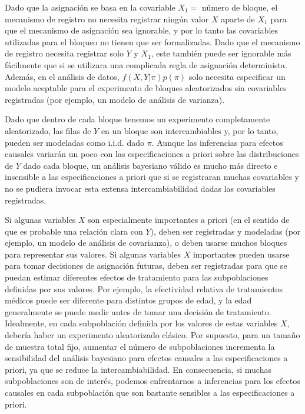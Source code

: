 \documentclass[12pt,a4paper]{article}
\begin{document}
{Dado que la asignación se basa en la covariable $X_1 =$ número de bloque, el mecanismo de registro no necesita registrar ningún valor $X$ aparte de $X_1$ para que el mecanismo de asignación sea ignorable, y por lo tanto las covariables utilizadas para el bloqueo no tienen que ser formalizadas. Dado que el mecanismo de registro necesita registrar solo $Y$ y $X_1$, este también puede ser ignorable más fácilmente que si se utilizara una complicada regla de asignación determinista. Además, en el análisis de datos, $f(X,Y|\pi)p(\pi)$ solo necesita especificar un modelo aceptable para el experimento de bloques aleatorizados sin covariables registradas (por ejemplo, un modelo de análisis de varianza). 

Dado que dentro de cada bloque tenemos un experimento completamente aleatorizado, las filas de $Y$ en un bloque son intercambiables y, por lo tanto, pueden ser modeladas como i.i.d. dado $\pi$. Aunque las inferencias para efectos causales variarán un poco con las especificaciones a priori sobre las distribuciones de $Y$ dado cada bloque, un análisis bayesiano válido es mucho más directo e insensible a las especificaciones a priori que si se registraran muchas covariables y no se pudiera invocar esta extensa intercambiabilidad dadas las covariables registradas. 

Si algunas variables $X$ son especialmente importantes a priori (en el sentido de que es probable una relación clara con $Y$), deben ser registradas y modeladas (por ejemplo, un modelo de análisis de covarianza), o deben usarse muchos bloques para representar sus valores. Si algunas variables $X$ importantes pueden usarse para tomar decisiones de asignación futuras, deben ser registradas para que se puedan estimar diferentes efectos de tratamiento para las subpoblaciones definidas por sus valores. Por ejemplo, la efectividad relativa de tratamientos médicos puede ser diferente para distintos grupos de edad, y la edad generalmente se puede medir antes de tomar una decisión de tratamiento. Idealmente, en cada subpoblación definida por los valores de estas variables $X$, debería haber un experimento aleatorizado clásico.  Por supuesto, para un tamaño de muestra total fijo, aumentar el número de subpoblaciones incrementa la sensibilidad del análisis bayesiano para efectos causales a las especificaciones a priori, ya que se reduce la intercambiabilidad.  En consecuencia, si muchas subpoblaciones son de interés, podemos enfrentarnos a inferencias para los efectos causales en cada subpoblación que son bastante sensibles a las especificaciones a priori. 

}
\end{document}
